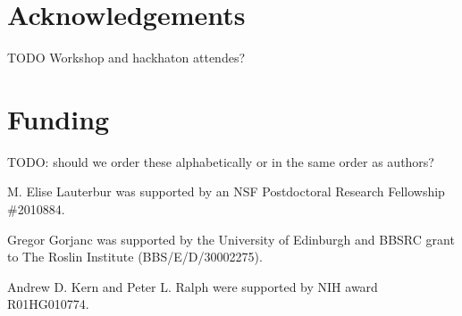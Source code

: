 \documentclass{article}
\begin{document}
\hypertarget{acknowledgements}{%
\section*{Acknowledgements}\label{acknowledgements}}

TODO Workshop and hackhaton attendes?

\hypertarget{funding}{%
\section*{Funding}\label{funding}}

TODO: should we order these alphabetically or in the same order as authors?

M. Elise Lauterbur was supported by an NSF Postdoctoral Research Fellowship \#2010884.

Gregor Gorjanc was supported by the University of Edinburgh and BBSRC grant to The Roslin Institute (BBS/E/D/30002275).

Andrew D. Kern and Peter L. Ralph were supported by NIH award R01HG010774.


\end{document}
